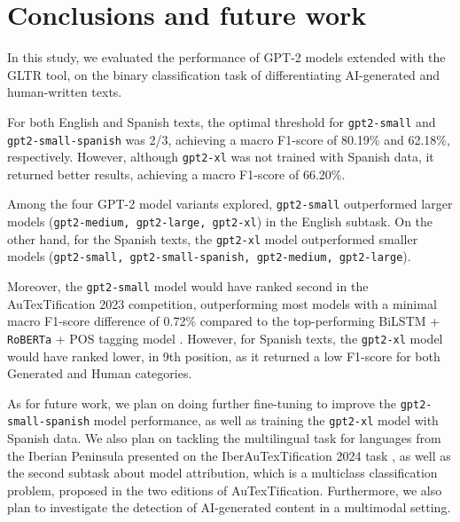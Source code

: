 \documentclass[a4paper,11pt,twocolumn,twoside]{article}
\begin{document}


\section{Conclusions and future work}
In this study, we evaluated the performance of GPT-2 models extended with the GLTR tool, on the binary classification task of differentiating AI-generated and human-written texts.

For both English and Spanish texts, the optimal threshold for \texttt{gpt2-small} and \texttt{gpt2-small-spanish} was 2/3, achieving a macro F1-score of 80.19\% and 62.18\%, respectively. However, although \texttt{gpt2-xl} was not trained with Spanish data, it returned better results, achieving a macro F1-score of 66.20\%. 

Among the four GPT-2 model variants explored, \texttt{gpt2-small} outperformed larger models (\texttt{gpt2-medium, gpt2-large, gpt2-xl}) in the English subtask. On the other hand, for the Spanish texts, the \texttt{gpt2-xl} model outperformed smaller models (\texttt{gpt2-small, gpt2-small-spanish, gpt2-medium, gpt2-large}).

Moreover, the \texttt{gpt2-small} model would have ranked second in the AuTexTification 2023 \cite{autextification} competition, outperforming most models with a minimal macro F1-score difference of 0.72\% compared to the top-performing BiLSTM + \texttt{RoBERTa} + POS tagging model \cite{taln-upf2023bilstm}. However, for Spanish texts, the \texttt{gpt2-xl} model would have ranked lower, in 9th position, as it returned a low F1-score for both Generated and Human categories.

As for future work, we plan on doing further fine-tuning to improve the \texttt{gpt2-small-spanish} model performance, as well as training the \texttt{gpt2-xl} model with Spanish data. We also plan on tackling the multilingual task for languages from the Iberian Peninsula presented on the IberAuTexTification 2024 task \cite{PLN6628}, as well as the second subtask about model attribution, which is a multiclass classification problem, proposed in the two editions of AuTexTification.%
Furthermore, we also plan to investigate the detection of AI-generated content in a multimodal setting.




\end{document}
